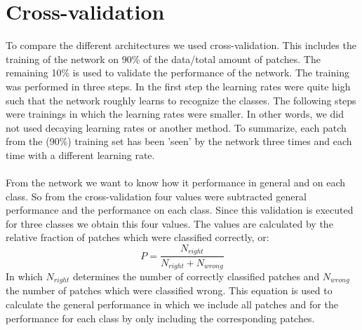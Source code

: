 \documentclass[a4paper,onecolumn]{report}
\begin{document}
\section{Cross-validation}
To compare the different architectures we used cross-validation. This includes the training of the network on 90\% of the data/total amount of patches. The remaining 10\% is used to validate the performance of the network. The training was performed in three steps. In the first step the learning rates were quite high such that the network roughly learns to recognize the classes. The following steps were trainings in which the learning rates were smaller. In other words, we did not used decaying learning rates or another method. To summarize, each patch from the (90\%) training set  has been 'seen' by the network three times and each time with a different learning rate. 
\\\\
From the network we want to know how it performance in general and on each class. So from the cross-validation four values were subtracted general performance and the performance on each class. Since this validation is executed for three classes we obtain this four values. The values are calculated by the relative fraction of patches which were classified correctly, or:
\begin{equation}
\label{eq:P}
	P= \frac{N_{right}}{N_{right}+ N_{wrong}}
\end{equation}
In which $N_{right}$ determines the number of correctly classified patches and $N_{wrong}$ the number of patches which were classified wrong. This equation is used to calculate the general performance in which we include all patches and for the performance for each class by only including the corresponding patches.
\end{document}
